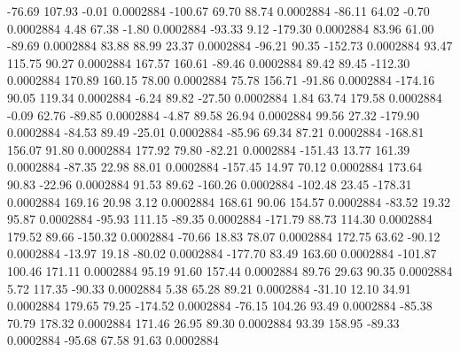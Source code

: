       -76.69      107.93       -0.01     0.0002884
     -100.67       69.70       88.74     0.0002884
      -86.11       64.02       -0.70     0.0002884
        4.48       67.38       -1.80     0.0002884
      -93.33        9.12     -179.30     0.0002884
       83.96       61.00      -89.69     0.0002884
       83.88       88.99       23.37     0.0002884
      -96.21       90.35     -152.73     0.0002884
       93.47      115.75       90.27     0.0002884
      167.57      160.61      -89.46     0.0002884
       89.42       89.45     -112.30     0.0002884
      170.89      160.15       78.00     0.0002884
       75.78      156.71      -91.86     0.0002884
     -174.16       90.05      119.34     0.0002884
       -6.24       89.82      -27.50     0.0002884
        1.84       63.74      179.58     0.0002884
       -0.09       62.76      -89.85     0.0002884
       -4.87       89.58       26.94     0.0002884
       99.56       27.32     -179.90     0.0002884
      -84.53       89.49      -25.01     0.0002884
      -85.96       69.34       87.21     0.0002884
     -168.81      156.07       91.80     0.0002884
      177.92       79.80      -82.21     0.0002884
     -151.43       13.77      161.39     0.0002884
      -87.35       22.98       88.01     0.0002884
     -157.45       14.97       70.12     0.0002884
      173.64       90.83      -22.96     0.0002884
       91.53       89.62     -160.26     0.0002884
     -102.48       23.45     -178.31     0.0002884
      169.16       20.98        3.12     0.0002884
      168.61       90.06      154.57     0.0002884
      -83.52       19.32       95.87     0.0002884
      -95.93      111.15      -89.35     0.0002884
     -171.79       88.73      114.30     0.0002884
      179.52       89.66     -150.32     0.0002884
      -70.66       18.83       78.07     0.0002884
      172.75       63.62      -90.12     0.0002884
      -13.97       19.18      -80.02     0.0002884
     -177.70       83.49      163.60     0.0002884
     -101.87      100.46      171.11     0.0002884
       95.19       91.60      157.44     0.0002884
       89.76       29.63       90.35     0.0002884
        5.72      117.35      -90.33     0.0002884
        5.38       65.28       89.21     0.0002884
      -31.10       12.10       34.91     0.0002884
      179.65       79.25     -174.52     0.0002884
      -76.15      104.26       93.49     0.0002884
      -85.38       70.79      178.32     0.0002884
      171.46       26.95       89.30     0.0002884
       93.39      158.95      -89.33     0.0002884
      -95.68       67.58       91.63     0.0002884
